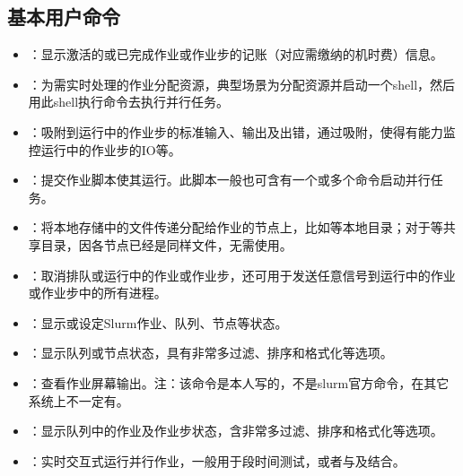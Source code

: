 \subsection{基本用户命令}
\begin{itemize}
	\item {}：显示激活的或已完成作业或作业步的记账（对应需缴纳的机时费）信息。
	\item {}：为需实时处理的作业分配资源，典型场景为分配资源并启动一个shell，然后用此shell执行命令去执行并行任务。
	\item {}：吸附到运行中的作业步的标准输入、输出及出错，通过吸附，使得有能力监控运行中的作业步的IO等。
	\item {}：提交作业脚本使其运行。此脚本一般也可含有一个或多个命令启动并行任务。
	\item {}：将本地存储中的文件传递分配给作业的节点上，比如等本地目录；对于等共享目录，因各节点已经是同样文件，无需使用。
	\item {}：取消排队或运行中的作业或作业步，还可用于发送任意信号到运行中的作业或作业步中的所有进程。
	\item {}：显示或设定Slurm作业、队列、节点等状态。
	\item {}：显示队列或节点状态，具有非常多过滤、排序和格式化等选项。
	\item {}：查看作业屏幕输出。注：该命令是本人写的，不是slurm官方命令，在其它系统上不一定有。
	\item {}：显示队列中的作业及作业步状态，含非常多过滤、排序和格式化等选项。
	\item {}：实时交互式运行并行作业，一般用于段时间测试，或者与及结合。%
\end{itemize}
\newpage
